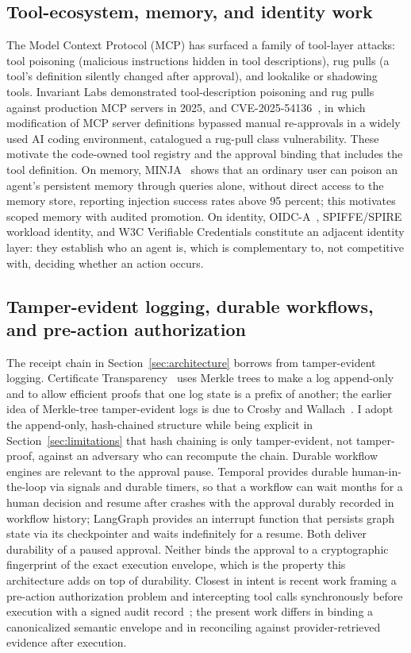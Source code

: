 \documentclass[11pt,letterpaper]{article}
\begin{document}
\subsection{Tool-ecosystem, memory, and identity work}\label{sec:related-tools}

The Model Context Protocol (MCP) has surfaced a family of tool-layer attacks: tool poisoning (malicious instructions hidden in tool descriptions), rug pulls (a tool's definition silently changed after approval), and lookalike or shadowing tools. Invariant Labs demonstrated tool-description poisoning and rug pulls against production MCP servers in 2025, and CVE-2025-54136~\cite{cve2025}, in which modification of MCP server definitions bypassed manual re-approvals in a widely used AI coding environment, catalogued a rug-pull class vulnerability. These motivate the code-owned tool registry and the approval binding that includes the tool definition. On memory, MINJA~\cite{dong2025minja} shows that an ordinary user can poison an agent's persistent memory through queries alone, without direct access to the memory store, reporting injection success rates above 95 percent; this motivates scoped memory with audited promotion. On identity, OIDC-A~\cite{oidca2025}, SPIFFE/SPIRE workload identity, and W3C Verifiable Credentials constitute an adjacent identity layer: they establish who an agent is, which is complementary to, not competitive with, deciding whether an action occurs.

\subsection{Tamper-evident logging, durable workflows, and pre-action authorization}\label{sec:related-logging}

The receipt chain in Section~\ref{sec:architecture} borrows from tamper-evident logging. Certificate Transparency~\cite{rfc6962,rfc9162} uses Merkle trees to make a log append-only and to allow efficient proofs that one log state is a prefix of another; the earlier idea of Merkle-tree tamper-evident logs is due to Crosby and Wallach~\cite{crosby2009}. I adopt the append-only, hash-chained structure while being explicit in Section~\ref{sec:limitations} that hash chaining is only tamper-evident, not tamper-proof, against an adversary who can recompute the chain. Durable workflow engines are relevant to the approval pause. Temporal provides durable human-in-the-loop via signals and durable timers, so that a workflow can wait months for a human decision and resume after crashes with the approval durably recorded in workflow history; LangGraph provides an interrupt function that persists graph state via its checkpointer and waits indefinitely for a resume. Both deliver durability of a paused approval. Neither binds the approval to a cryptographic fingerprint of the exact execution envelope, which is the property this architecture adds on top of durability. Closest in intent is recent work framing a pre-action authorization problem and intercepting tool calls synchronously before execution with a signed audit record~\cite{uchibeke2026}; the present work differs in binding a canonicalized semantic envelope and in reconciling against provider-retrieved evidence after execution.
\end{document}
